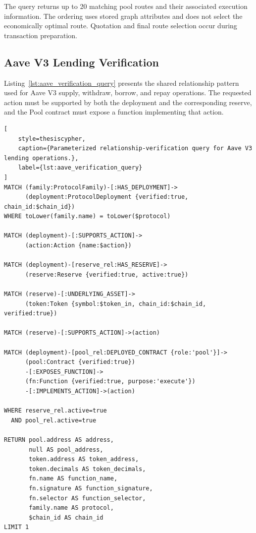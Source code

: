 The query returns up to 20 matching pool routes
and their associated execution information. The
ordering uses stored graph attributes and does not
select the economically optimal route. Quotation
and final route selection occur during transaction
preparation.



\subsection{Aave V3 Lending Verification}

Listing~\ref{lst:aave_verification_query} presents
the shared relationship pattern used for Aave V3
supply, withdraw, borrow, and repay operations.
The requested action must be supported by both
the deployment and the corresponding reserve,
and the Pool contract must expose a function
implementing that action.

\begin{lstlisting}[
    style=thesiscypher,
    caption={Parameterized relationship-verification query for Aave V3 lending operations.},
    label={lst:aave_verification_query}
]
MATCH (family:ProtocolFamily)-[:HAS_DEPLOYMENT]->
      (deployment:ProtocolDeployment {verified:true, chain_id:$chain_id})
WHERE toLower(family.name) = toLower($protocol)

MATCH (deployment)-[:SUPPORTS_ACTION]->
      (action:Action {name:$action})

MATCH (deployment)-[reserve_rel:HAS_RESERVE]->
      (reserve:Reserve {verified:true, active:true})

MATCH (reserve)-[:UNDERLYING_ASSET]->
      (token:Token {symbol:$token_in, chain_id:$chain_id, verified:true})

MATCH (reserve)-[:SUPPORTS_ACTION]->(action)

MATCH (deployment)-[pool_rel:DEPLOYED_CONTRACT {role:'pool'}]->
      (pool:Contract {verified:true})
      -[:EXPOSES_FUNCTION]->
      (fn:Function {verified:true, purpose:'execute'})
      -[:IMPLEMENTS_ACTION]->(action)

WHERE reserve_rel.active=true
  AND pool_rel.active=true

RETURN pool.address AS address,
       null AS pool_address,
       token.address AS token_address,
       token.decimals AS token_decimals,
       fn.name AS function_name,
       fn.signature AS function_signature,
       fn.selector AS function_selector,
       family.name AS protocol,
       $chain_id AS chain_id
LIMIT 1
\end{lstlisting}

